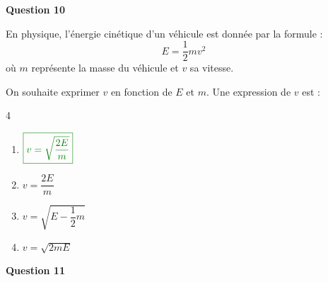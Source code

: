 \documentclass[10pt]{article}
\begin{document}
\textbf{Question 10}
	
	En physique, l'énergie cinétique d'un véhicule est donnée par la formule :
	\[E=\dfrac{1}{2}m v^{2}\]
	où $m$ représente la masse du véhicule et $v$ sa vitesse.
	
	On souhaite exprimer $v$ en fonction de $E$ et $m$. Une expression de $v$ est :
	
\begin{multicols}{4}
\begin{enumerate}[label=\textbf{\alph* .}]
	\item $\begin{color}{green!50!black}\boxed{v=\sqrt{\dfrac{2E}{m}}}\end{color}$
	\item $v=\dfrac{2E}{m}$ 
	\item $v=\sqrt{E-\dfrac{1}{2}m}$ 
	\item $v=\sqrt{2mE}$ 
\end{enumerate}
\end{multicols}


		\textbf{Question 11}
\end{document}
